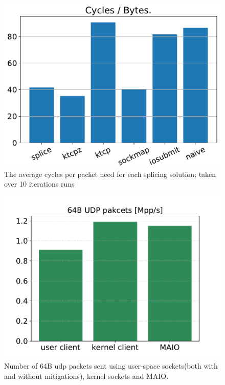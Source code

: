 \begin{figure}[t]
    \centering
    \includegraphics[width=\columnwidth]{Figure_1.pdf}
    \caption{The average cycles per packet need for each splicing solution; taken over 10 iterations runs }
    \label{fig:cyc_byte}
\end{figure}
\begin{figure}[t]
    \centering
    \includegraphics[width=\columnwidth]{bifurcated.pdf}
    \caption{Number of 64B udp packets sent using user-space sockets(both with and without mitigations), kernel sockets and MAIO.} 
    \label{fig:pps}
\end{figure}

